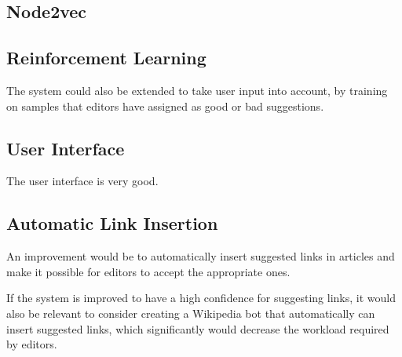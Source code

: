 \subsection{Node2vec}

\subsection{Reinforcement Learning}
The system could also be extended to take user input into account, by training on samples that editors have assigned as good or bad suggestions.

\subsection{User Interface}
The user interface is very good. 

\subsection{Automatic Link Insertion}
An improvement would be to automatically insert suggested links in articles and make it possible for editors to accept the appropriate ones.

If the system is improved to have a high confidence for suggesting links, it would also be relevant to consider creating a Wikipedia bot that automatically can insert suggested links, which significantly would decrease the workload required by editors.

